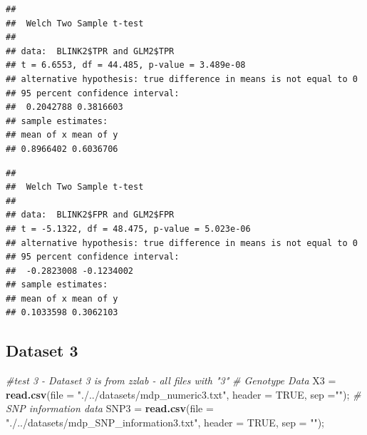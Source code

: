 \documentclass[
]{article}
\newenvironment{Shaded}{\begin{snugshade}}{\end{snugshade}}
\newcommand{\CommentTok}[1]{\textcolor[rgb]{0.56,0.35,0.01}{\textit{#1}}}
\newcommand{\DataTypeTok}[1]{\textcolor[rgb]{0.13,0.29,0.53}{#1}}
\newcommand{\KeywordTok}[1]{\textcolor[rgb]{0.13,0.29,0.53}{\textbf{#1}}}
\newcommand{\NormalTok}[1]{#1}
\newcommand{\OperatorTok}[1]{\textcolor[rgb]{0.81,0.36,0.00}{\textbf{#1}}}
\newcommand{\OtherTok}[1]{\textcolor[rgb]{0.56,0.35,0.01}{#1}}
\newcommand{\StringTok}[1]{\textcolor[rgb]{0.31,0.60,0.02}{#1}}
\begin{document}
\begin{Shaded}
\end{Shaded}

\begin{verbatim}
## 
##  Welch Two Sample t-test
## 
## data:  BLINK2$TPR and GLM2$TPR
## t = 6.6553, df = 44.485, p-value = 3.489e-08
## alternative hypothesis: true difference in means is not equal to 0
## 95 percent confidence interval:
##  0.2042788 0.3816603
## sample estimates:
## mean of x mean of y 
## 0.8966402 0.6036706
\end{verbatim}

\begin{Shaded}
\end{Shaded}

\begin{verbatim}
## 
##  Welch Two Sample t-test
## 
## data:  BLINK2$FPR and GLM2$FPR
## t = -5.1322, df = 48.475, p-value = 5.023e-06
## alternative hypothesis: true difference in means is not equal to 0
## 95 percent confidence interval:
##  -0.2823008 -0.1234002
## sample estimates:
## mean of x mean of y 
## 0.1033598 0.3062103
\end{verbatim}

\hypertarget{dataset-3}{%
\subsection{Dataset 3}\label{dataset-3}}

\begin{Shaded}
\begin{Highlighting}[]
\CommentTok{\#test 3 {-} Dataset 3 is from zzlab {-} all files with "3"}
\CommentTok{\# Genotype Data}
\NormalTok{X3 =}\StringTok{ }\KeywordTok{read.csv}\NormalTok{(}\DataTypeTok{file =} \StringTok{"./../datasets/mdp\_numeric3.txt"}\NormalTok{, }\DataTypeTok{header =} \OtherTok{TRUE}\NormalTok{, }\DataTypeTok{sep =}\StringTok{""}\NormalTok{);}
\CommentTok{\# SNP information data}
\NormalTok{SNP3 =}\StringTok{ }\KeywordTok{read.csv}\NormalTok{(}\DataTypeTok{file =} \StringTok{"./../datasets/mdp\_SNP\_information3.txt"}\NormalTok{, }\DataTypeTok{header =} \OtherTok{TRUE}\NormalTok{, }\DataTypeTok{sep =} \StringTok{""}\NormalTok{);}
\end{Highlighting}
\end{Shaded}
\end{document}
